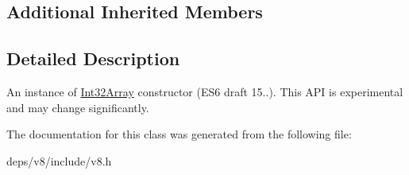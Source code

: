 \subsection*{Additional Inherited Members}


\subsection{Detailed Description}
An instance of \hyperlink{classv8_1_1_int32_array}{Int32\+Array} constructor (E\+S6 draft 15..). This A\+P\+I is experimental and may change significantly. 

The documentation for this class was generated from the following file\+:\begin{DoxyCompactItemize}
\item 
deps/v8/include/v8.\+h\end{DoxyCompactItemize}

